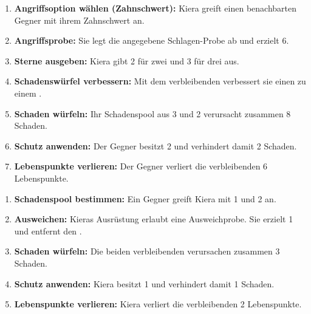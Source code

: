 \begin{beispiel}[title=Beispiel: Ein Held greift an]
\begin{enumerate}
  \item \textbf{Angriffsoption wählen (Zahnschwert):} Kiera greift einen benachbarten Gegner mit ihrem Zahnschwert an.
  \item \textbf{Angriffsprobe:} Sie legt die angegebene Schlagen-Probe ab und erzielt 6\star.
  \item \textbf{Sterne ausgeben:} Kiera gibt 2\star{} für zwei \redDmgDie{} und 3\star{} für drei \orangeDmgDie{} aus.
  \item \textbf{Schadenswürfel verbessern:} Mit dem verbleibenden \star{} verbessert sie einen \orangeDmgDie{} zu einem \redDmgDie{}.
  \item \textbf{Schaden würfeln:} Ihr Schadenspool aus 3\redDmgDie{} und 2\orangeDmgDie{} verursacht zusammen 8 Schaden.
  \item \textbf{Schutz anwenden:} Der Gegner besitzt 2\armor{} und verhindert damit 2 Schaden.
  \item \textbf{Lebenspunkte verlieren:} Der Gegner verliert die verbleibenden 6 Lebenspunkte.
\end{enumerate}
\end{beispiel}

\begin{beispiel}[title=Beispiel: Ein Gegner greift an]
\begin{enumerate}
  \item \textbf{Schadenspool bestimmen:} Ein Gegner greift Kiera mit 1\blackDmgDie{} und 2\orangeDmgDie{} an.
  \item \textbf{Ausweichen:} Kieras Ausrüstung erlaubt eine Ausweichprobe. Sie erzielt 1\star{} und entfernt den \blackDmgDie.
  \item \textbf{Schaden würfeln:} Die beiden verbleibenden \orangeDmgDie{} verursachen zusammen 3 Schaden.
  \item \textbf{Schutz anwenden:} Kiera besitzt 1\armor{} und verhindert damit 1 Schaden.
  \item \textbf{Lebenspunkte verlieren:} Kiera verliert die verbleibenden 2 Lebenspunkte.
\end{enumerate}
\end{beispiel}
